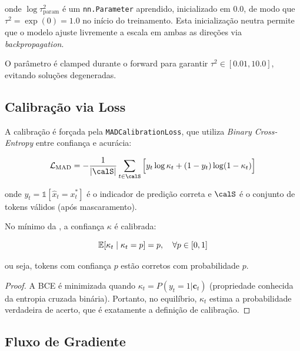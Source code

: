 onde $\log \tau^2_{\text{param}}$ \'e um \texttt{nn.Parameter} aprendido,
inicializado em $0.0$, de modo que $\tau^2 = \exp(0) = 1.0$ no in\'icio
do treinamento. Esta inicializa\c{c}\~ao neutra permite que o modelo ajuste
livremente a escala em ambas as dire\c{c}\~oes via \textit{backpropagation}.

O par\^ametro \'e clamped durante o forward para garantir
$\tau^2 \in [0.01, 10.0]$, evitando solu\c{c}\~oes degeneradas.

\subsection{Calibra\c{c}\~ao via Loss}

A calibra\c{c}\~ao \'e for\c{c}ada pela \texttt{MADCalibrationLoss}, que utiliza
\textit{Binary Cross-Entropy} entre confian\c{c}a e acur\'acia:

\begin{equation}
    \calL_{\text{MAD}} = -\frac{1}{|\calS|}\sum_{t \in \calS} \Big[
        y_t \log \kappa_t + (1 - y_t) \log(1 - \kappa_t)
    \Big]
    \label{eq:mad_loss}
\end{equation}

onde $y_t = \mathbb{1}[\hat{x}_t = x_t^*]$ \'e o indicador de predi\c{c}\~ao
correta e $\calS$ \'e o conjunto de tokens v\'alidos (ap\'os mascaramento).

\begin{theorem}
\label{thm:calibration}
No m\'inimo da , a confian\c{c}a $\kappa$ \'e calibrada:

\begin{equation}
    \mathbb{E}[\kappa_t \mid \kappa_t = p] = p, \quad \forall p \in [0, 1]
\end{equation}

ou seja, tokens com confian\c{c}a $p$ est\~ao corretos com probabilidade $p$.
\end{theorem}

\begin{proof}
A BCE \'e minimizada quando $\kappa_t = P(y_t = 1 | \bm{c}_t)$
(propriedade conhecida da entropia cruzada bin\'aria). Portanto, no
equil\'ibrio, $\kappa_t$ estima a probabilidade verdadeira de acerto,
que \'e exatamente a defini\c{c}\~ao de calibra\c{c}\~ao.
\end{proof}

\subsection{Fluxo de Gradiente}

